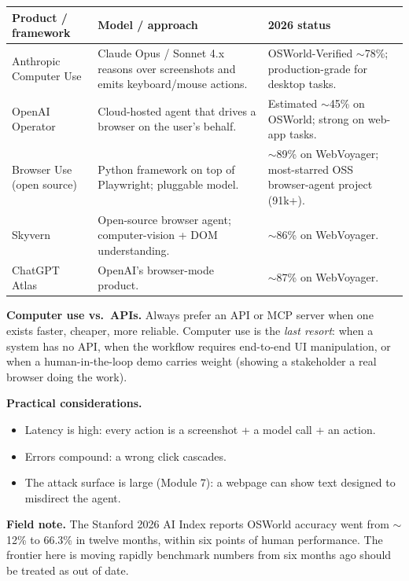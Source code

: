 \documentclass[a4paper,11pt]{article}
\begin{document}
\begin{center}\small
\begin{tabular}{p{3.2cm} p{4.6cm} p{4.8cm}}
  \toprule
  \textbf{Product / framework} & \textbf{Model / approach} & \textbf{2026 status} \\
  \midrule
  Anthropic Computer Use &
    Claude Opus / Sonnet 4.x reasons over screenshots and emits
    keyboard/mouse actions. &
    OSWorld-Verified $\sim$78\%; production-grade for desktop tasks. \\
  \addlinespace
  OpenAI Operator &
    Cloud-hosted agent that drives a browser on the user's behalf. &
    Estimated $\sim$45\% on OSWorld; strong on web-app tasks. \\
  \addlinespace
  Browser Use (open source) &
    Python framework on top of Playwright; pluggable model. &
    $\sim$89\% on WebVoyager; most-starred OSS browser-agent project (91k+). \\
  \addlinespace
  Skyvern &
    Open-source browser agent; computer-vision + DOM understanding. &
    $\sim$86\% on WebVoyager. \\
  \addlinespace
  ChatGPT Atlas &
    OpenAI's browser-mode product. &
    $\sim$87\% on WebVoyager. \\
  \bottomrule
\end{tabular}
\end{center}

\textbf{Computer use vs.\ APIs.} Always prefer an API or MCP server
when one exists \textemdash{} faster, cheaper, more reliable.
Computer use is the \emph{last resort}: when a system has no API,
when the workflow requires end-to-end UI manipulation, or when a
human-in-the-loop demo carries weight (showing a stakeholder a real
browser doing the work).

\textbf{Practical considerations.}
\begin{itemize}[noitemsep, leftmargin=1.2em]
  \item Latency is high: every action is a screenshot + a model call
        + an action.
  \item Errors compound: a wrong click cascades.
  \item The attack surface is large (Module 7): a webpage can show
        text designed to misdirect the agent.
\end{itemize}

\begin{ambercallout}
\textbf{Field note.}
The Stanford 2026 AI Index reports OSWorld accuracy went from
$\sim$12\% to 66.3\% in twelve months, within six points of human
performance. The frontier here is moving rapidly \textemdash{}
benchmark numbers from six months ago should be treated as out of
date.
\end{ambercallout}
\end{document}
